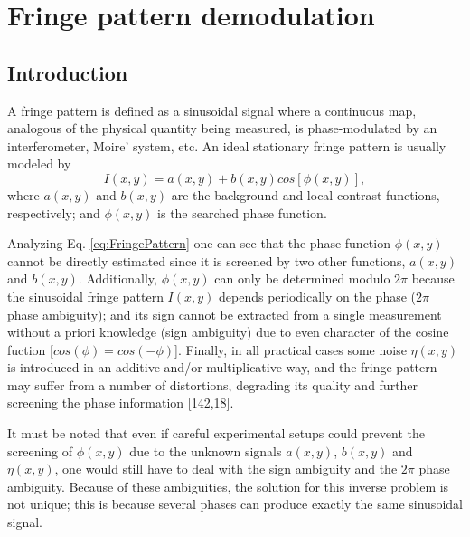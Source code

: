 \chapter{Fringe pattern demodulation}

\section{Introduction}

A fringe pattern is defined as a sinusoidal signal where a continuous map, 
analogous of the physical quantity being measured, is phase-modulated by an 
interferometer, Moire' system, etc. An ideal stationary fringe pattern is usually
modeled by
\begin{equation}\label{eq:FringePattern}
I(x,y)=a(x,y)+b(x,y)cos[\phi(x,y)],
\end{equation}
where $a(x,y)$ and $b(x,y)$ are the background and local contrast functions,
respectively; and $\phi(x,y)$ is the searched phase function.

Analyzing Eq. \eqref{eq:FringePattern} one can see that the phase function
$\phi(x,y)$ cannot be directly estimated since it is screened by two other
functions, $a(x,y)$ and $b(x,y)$. Additionally, $\phi(x,y)$ can only be
determined modulo $2\pi$ because the sinusoidal fringe pattern $I(x,y)$ depends
periodically on the phase ($2\pi$ phase ambiguity); and its sign cannot be 
extracted from a single measurement without a priori knowledge (sign ambiguity)
due to even character of the cosine fuction [$cos(\phi)=cos(-\phi)$]. Finally, 
in all practical cases some noise $\eta(x,y)$ is introduced in an additive and/or
multiplicative way, and the fringe pattern may suffer from a number of distortions,
degrading its quality and further screening the phase information [142,18].

It must be noted that even if careful experimental setups could prevent the
screening of $\phi(x,y)$ due to the unknown signals $a(x,y)$, $b(x,y)$ and $\eta
(x,y)$, one would still have to deal with the sign ambiguity and the $2\pi$ phase
ambiguity. Because of these ambiguities, the solution for this inverse problem is
not unique; this is because several phases can produce exactly the same sinusoidal
signal.

